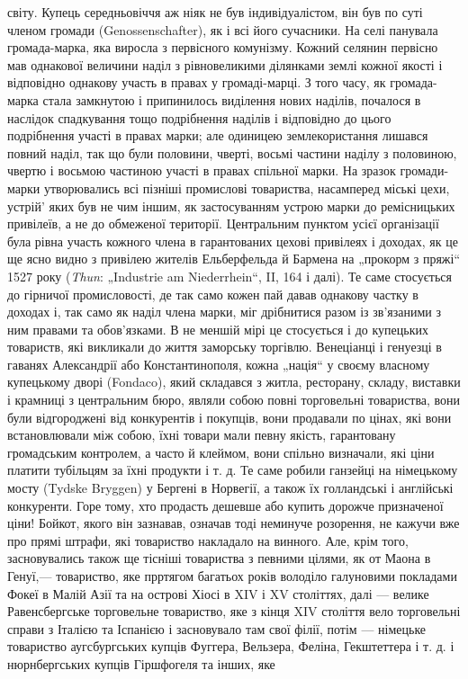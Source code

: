 \parcont{}  %
світу. Купець середньовіччя аж ніяк не був індивідуалістом, він був по суті членом громади (Genossenschafter), як і всі його
сучасники. На селі панувала громада-марка, яка виросла з первісного комунізму. Кожний селянин первісно мав однакової
величини наділ з рівновеликими ділянками землі кожної якості і відповідно однакову участь в правах у громаді-марці. З того
часу, як громада-марка стала замкнутою і припинилось виділення нових наділів, почалося в наслідок спадкування тощо
подрібнення наділів і відповідно до цього подрібнення участі в правах марки; але одиницею землекористання лишався повний
наділ, так що були половини, чверті, восьмі частини наділу з половиною, чвертю і восьмою частиною участі в правах спільної
марки. На зразок громади-марки утворювались всі пізніші промислові товариства, насамперед міські цехи, устрій'
яких був не чим іншим, як застосуванням устрою марки до ремісницьких привілеїв, а не до обмеженої території. Центральним
пунктом усієї організації була рівна участь кожного члена в гарантованих цехові привілеях і доходах, як це ще ясно видно з
привілею жителів Ельберфельда й Бармена на „прокорм з пряжі“ 1527 року (\emph{Thun}: „Industrie am Niederrhein“,  II, 164 і далі).
Те саме стосується до гірничої промисловості, де так само кожен пай давав однакову частку в доходах і, так само як наділ
члена марки, міг дрібнитися разом із зв’язаними з ним правами та обов’язками. В не меншій мірі це стосується і до купецьких
товариств, які викликали до життя заморську торгівлю. Венеціанці і генуезці в гаванях Александрії або Константинополя, кожна
„нація“ у своєму власному купецькому дворі (Fondaco), який складався з житла, ресторану, складу, виставки і крамниці з
центральним бюро, являли собою повні торговельні товариства, вони були відгороджені від конкурентів і покупців, вони
продавали по цінах, які вони встановлювали між собою, їхні товари мали певну якість, гарантовану громадським контролем, а
часто й клеймом, вони спільно визначали, які ціни платити тубільцям за їхні продукти і т. д. Те саме робили ганзейці на
німецькому мосту (Tydske Bryggen) у Бергені в Норвегії, а також їх голландські і англійські конкуренти. Горе тому, хто
продасть дешевше або купить дорожче призначеної ціни! Бойкот, якого він зазнавав, означав тоді неминуче розорення, не кажучи
вже про прямі штрафи, які товариство накладало на винного. Але, крім того, засновувались також ще тісніші товариства з
певними цілями, як от Маона в Генуї,—  товариство, яке прртягом багатьох років володіло галуновими покладами Фокеї в Малій
Азії та на острові Хіосі в XIV і XV  століттях, далі — велике Равенсбергське торговельне товариство, яке з кінця XIV
століття вело торговельні справи з Італією та Іспанією і засновувало там свої філії, потім — німецьке товариство
аугсбургських купців Фуггера, Вельзера, Феліна, Гекштеттера і т. д. і нюрнбергських купців Гіршфогеля та інших, яке
\parbreak{}  %

